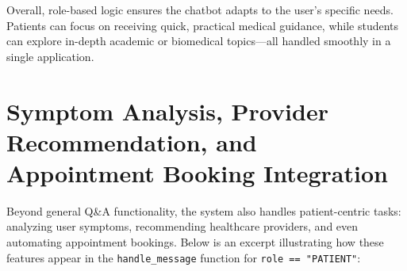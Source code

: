 \noindent
Overall, role-based logic ensures the chatbot adapts to the user’s specific needs. Patients can focus on receiving quick, practical medical guidance, while students can explore in-depth academic or biomedical topics—all handled smoothly in a single application.

\section{Symptom Analysis, Provider Recommendation, and Appointment Booking Integration}
\label{sec:provider-appointment}

Beyond general Q\&A functionality, the system also handles patient-centric tasks: analyzing user symptoms, 
recommending healthcare providers, and even automating appointment bookings. Below is an excerpt illustrating 
how these features appear in the \texttt{handle\_message} function for \texttt{role == "PATIENT"}:

